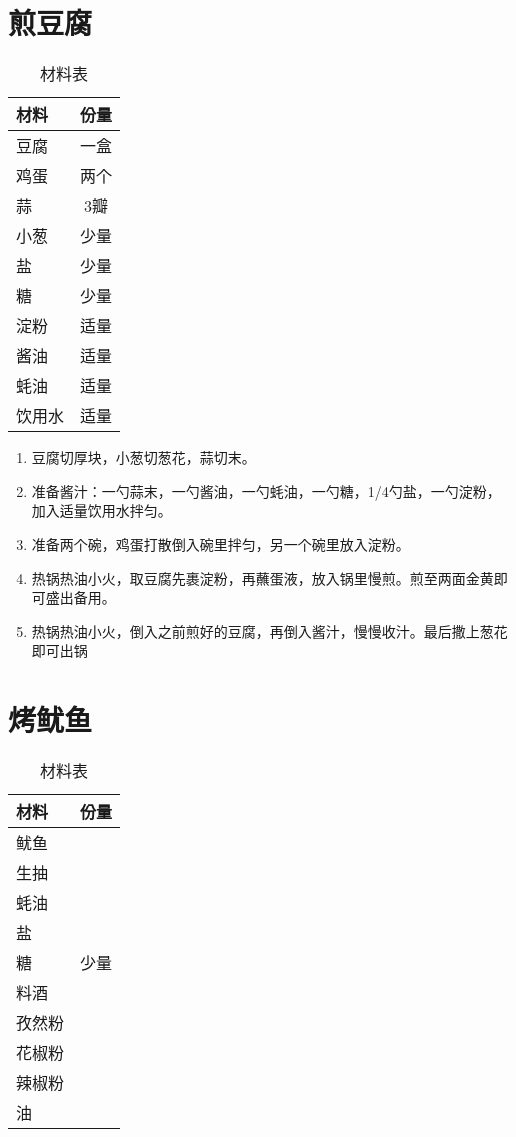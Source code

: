 \section{煎豆腐}

\begin{table}[H]
    \centering
    \begin{tabular}{|l||c|}\hline
     \textbf{材料}    &  \textbf{份量}\\ \hline\hline
    豆腐    &  一盒 \\ \hline
    鸡蛋    & 两个 \\ \hline
    蒜 & 3瓣 \\ \hline
    小葱 & 少量 \\ \hline
    盐 &  少量 \\ \hline
    糖 &  少量 \\ \hline
    淀粉 & 适量 \\ \hline
    酱油 & 适量 \\ \hline
    蚝油 & 适量 \\ \hline
    饮用水 & 适量 \\ \hline
    \end{tabular}
    \caption{材料表}
\end{table}

\begin{enumerate}
    \item 豆腐切厚块，小葱切葱花，蒜切末。
    \item 准备酱汁：一勺蒜末，一勺酱油，一勺蚝油，一勺糖，1/4勺盐，一勺淀粉，加入适量饮用水拌匀。
    \item 准备两个碗，鸡蛋打散倒入碗里拌匀，另一个碗里放入淀粉。
    \item 热锅热油小火，取豆腐先裹淀粉，再蘸蛋液，放入锅里慢煎。煎至两面金黄即可盛出备用。
    \item 热锅热油小火，倒入之前煎好的豆腐，再倒入酱汁，慢慢收汁。最后撒上葱花即可出锅
\end{enumerate}

\section{烤鱿鱼}

\begin{table}[H]
    \centering
    \begin{tabular}{|l||c|}\hline
     \textbf{材料}    &  \textbf{份量}\\ \hline\hline
    鱿鱼    &   \\ \hline
    生抽    &  \\ \hline
    蚝油    &  \\ \hline
    盐    &  \\ \hline
    糖    & 少量 \\ \hline
    料酒    &  \\ \hline
    孜然粉    &  \\ \hline
    花椒粉  &  \\ \hline
    辣椒粉    &  \\ \hline
    油    &  \\ \hline
    \end{tabular}
    \caption{材料表}
\end{table}

